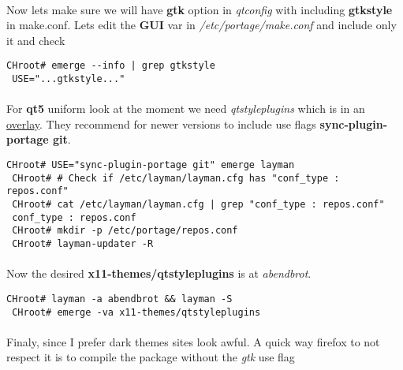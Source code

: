 \documentclass[11pt,a4paper]{article}
\begin{document}
                    \paragraph{} Now lets make sure we will have \textbf{gtk} option in \textit{qtconfig} with including \textbf{gtkstyle} in make.conf. Lets edit the \textbf{GUI} var in \textit{/etc/portage/make.conf} and include only it and check
                    
                    \begin{lstlisting}[style=BashInputCHRoot]
 CHroot# emerge --info | grep gtkstyle
 USE="...gtkstyle..."
                    \end{lstlisting}
                    
                    \paragraph{} For \textbf{qt5} uniform look at the moment we need \textit{qtstyleplugins} which is in an \href{https://wiki.gentoo.org/wiki/Layman}{overlay}. They recommend for newer versions to include use flags \textbf{sync-plugin-portage git}.
                    
                    \begin{lstlisting}[style=BashInputCHRoot]
 CHroot# USE="sync-plugin-portage git" emerge layman
 CHroot# # Check if /etc/layman/layman.cfg has "conf_type : repos.conf"
 CHroot# cat /etc/layman/layman.cfg | grep "conf_type : repos.conf"
 conf_type : repos.conf
 CHroot# mkdir -p /etc/portage/repos.conf
 CHroot# layman-updater -R
                    \end{lstlisting}
                    
                    \paragraph{} Now the desired \textbf{x11-themes/qtstyleplugins} is at \textit{abendbrot}.
                    
                    \begin{lstlisting}[style=BashInputCHRoot]
 CHroot# layman -a abendbrot && layman -S
 CHroot# emerge -va x11-themes/qtstyleplugins
                    \end{lstlisting}
                    
                    \paragraph{} Finaly, since I prefer dark themes sites look awful. A quick way firefox to not respect it is to compile the package without the \textit{gtk} use flag
                    
\end{document}
